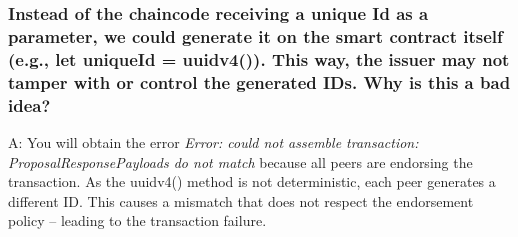 \documentclass[12pt,a4paper]{article}
\begin{document}
\subsubsection*{Instead of the chaincode receiving a unique Id as a parameter, we could generate it on the smart contract itself (e.g., let uniqueId = uuidv4()). This way, the issuer may not tamper with or control the generated IDs. Why is this a bad idea?}

A: You will obtain the error \emph{Error: could not assemble transaction: ProposalResponsePayloads do not match} because all peers are endorsing the transaction. As the uuidv4() method is not deterministic, each peer generates a different ID. This causes a mismatch that does not respect the endorsement policy -- leading to the transaction failure.



\end{document}
